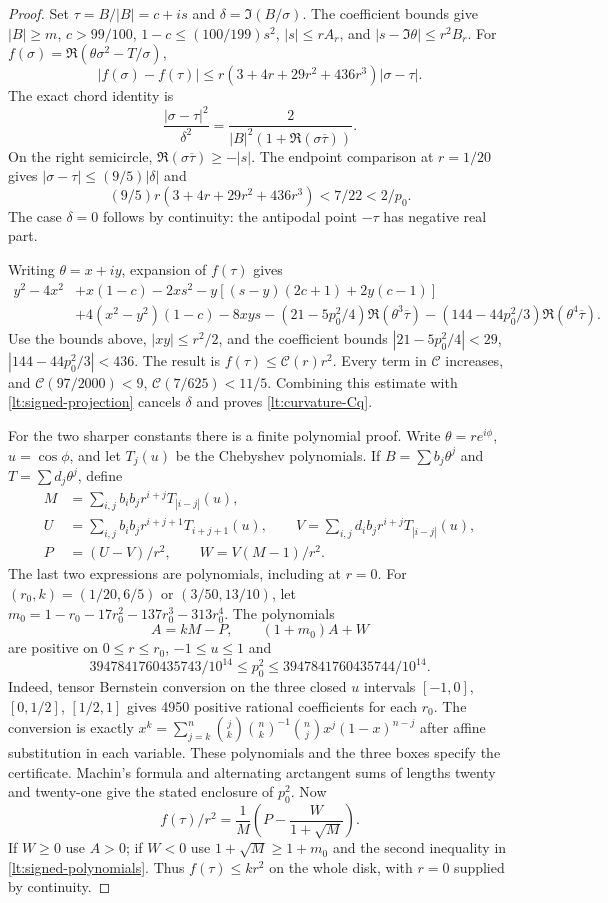 \begin{proof}
Set $\tau=B/|B|=c+is$ and $\delta=\Im(B/\sigma)$.
The coefficient bounds give $|B|\ge m$, $c>99/100$,
$1-c\le(100/199)s^2$, $|s|\le rA_r$, and
$|s-\Im\theta|\le r^2B_r$. For
$f(\sigma)=\Re(\theta\sigma^2-T/\sigma)$,
\[
 |f(\sigma)-f(\tau)|
 \le r(3+4r+29r^2+436r^3)|\sigma-\tau|.
\]
The exact chord identity is
\[
 \frac{|\sigma-\tau|^2}{\delta^2}
   =\frac{2}{|B|^2(1+\Re(\sigma\overline\tau))}.
\]
On the right semicircle, $\Re(\sigma\overline\tau)\ge-|s|$.
The endpoint comparison at $r=1/20$ gives
$|\sigma-\tau|\le(9/5)|\delta|$ and
\[
 (9/5)r(3+4r+29r^2+436r^3)<7/22<2/p_0.
\]
The case $\delta=0$ follows by continuity: the antipodal point
$-\tau$ has negative real part.

Writing $\theta=x+iy$, expansion of $f(\tau)$ gives
\begin{align*}
 y^2-4x^2&+x(1-c)-2xs^2-y[(s-y)(2c+1)+2y(c-1)]\\
 &+4(x^2-y^2)(1-c)-8xys
 -(21-5p_0^2/4)\Re(\theta^3\overline\tau)
 -(144-44p_0^2/3)\Re(\theta^4\overline\tau).
\end{align*}
Use the bounds above, $|xy|\le r^2/2$, and the coefficient bounds
$|21-5p_0^2/4|<29$, $|144-44p_0^2/3|<436$.
The result is $f(\tau)\le\mathcal C(r)r^2$.
Every term in $\mathcal C$ increases, and
$\mathcal C(97/2000)<9$, $\mathcal C(7/625)<11/5$.
Combining this estimate with \eqref{lt:signed-projection} cancels
$\delta$ and proves \eqref{lt:curvature-Cq}.

For the two sharper constants there is a finite polynomial proof.
Write $\theta=re^{i\phi}$, $u=\cos\phi$, and let $T_j(u)$ be the
Chebyshev polynomials. If $B=\sum b_j\theta^j$ and
$T=\sum d_j\theta^j$, define
\begin{align*}
 M&=\sum_{i,j}b_ib_jr^{i+j}T_{|i-j|}(u),\\
 U&=\sum_{i,j}b_ib_jr^{i+j+1}T_{i+j+1}(u),\qquad
 V=\sum_{i,j}d_ib_jr^{i+j}T_{|i-j|}(u),\\
 P&=(U-V)/r^2,\qquad W=V(M-1)/r^2.
\end{align*}
The last two expressions are polynomials, including at $r=0$.
For $(r_0,k)=(1/20,6/5)$ or $(3/50,13/10)$, let
$m_0=1-r_0-17r_0^2-137r_0^3-313r_0^4$. The polynomials
\begin{equation}\label{lt:signed-polynomials}
 A=kM-P,\qquad (1+m_0)A+W
\end{equation}
are positive on $0\le r\le r_0$, $-1\le u\le1$ and
\[
 3947841760435743/10^{14}\le p_0^2
           \le3947841760435744/10^{14}.
\]
Indeed, tensor Bernstein conversion on the three closed $u$ intervals
$[-1,0]$, $[0,1/2]$, $[1/2,1]$ gives 4950 positive rational
coefficients for each $r_0$. The conversion is exactly
$x^k=\sum_{j=k}^n\binom jk\binom nk^{-1}
\binom njx^j(1-x)^{n-j}$ after affine substitution in each variable.
These polynomials and the three boxes specify the certificate.
Machin's formula and alternating arctangent sums of
lengths twenty and twenty-one give the stated enclosure of $p_0^2$.
Now
\[
 f(\tau)/r^2=\frac1M\left(P-\frac{W}{1+\sqrt M}\right).
\]
If $W\ge0$ use $A>0$; if $W<0$ use $1+\sqrt M\ge1+m_0$ and
the second inequality in \eqref{lt:signed-polynomials}. Thus
$f(\tau)\le kr^2$ on the whole disk, with $r=0$ supplied by continuity.


\end{proof}
